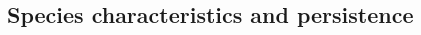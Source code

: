 \documentclass[12pt]{article}
\begin{document}
\begin{spacing}{2.0}
    \subsection*{Species characteristics and persistence}
    

    
    \clearpage
    


        

\end{spacing}
\end{document}
